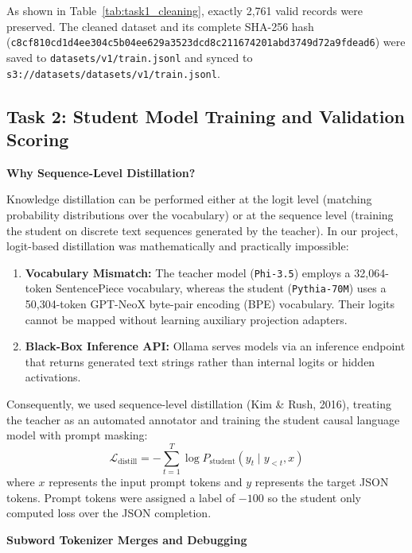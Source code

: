 \documentclass[10pt,a4paper]{article}
\begin{document}
As shown in Table~\ref{tab:task1_cleaning}, exactly 2,761 valid records were preserved. The cleaned dataset and its complete SHA-256 hash (\texttt{c8cf810cd1d4ee304c5b04ee629a3523dcd8c211674201abd3749d72a9fdead6}) were saved to \texttt{datasets/v1/train.jsonl} and synced to \texttt{s3://datasets/datasets/v1/train.jsonl}.

\subsection*{Task 2: Student Model Training and Validation Scoring}

\textbf{Why Sequence-Level Distillation?}

Knowledge distillation can be performed either at the logit level (matching probability distributions over the vocabulary) or at the sequence level (training the student on discrete text sequences generated by the teacher). In our project, logit-based distillation was mathematically and practically impossible:
\begin{enumerate}
    \item \textbf{Vocabulary Mismatch:} The teacher model (\texttt{Phi-3.5}) employs a 32,064-token SentencePiece vocabulary, whereas the student (\texttt{Pythia-70M}) uses a 50,304-token GPT-NeoX byte-pair encoding (BPE) vocabulary. Their logits cannot be mapped without learning auxiliary projection adapters.
    \item \textbf{Black-Box Inference API:} Ollama serves models via an inference endpoint that returns generated text strings rather than internal logits or hidden activations.
\end{enumerate}

Consequently, we used sequence-level distillation (Kim \& Rush, 2016), treating the teacher as an automated annotator and training the student causal language model with prompt masking:
\begin{equation}
\mathcal{L}_{\text{distill}} = - \sum_{t=1}^T \log P_{\text{student}}(y_t \mid y_{<t}, x)
\end{equation}
where $x$ represents the input prompt tokens and $y$ represents the target JSON tokens. Prompt tokens were assigned a label of $-100$ so the student only computed loss over the JSON completion.

\textbf{Subword Tokenizer Merges and Debugging}
\end{document}
